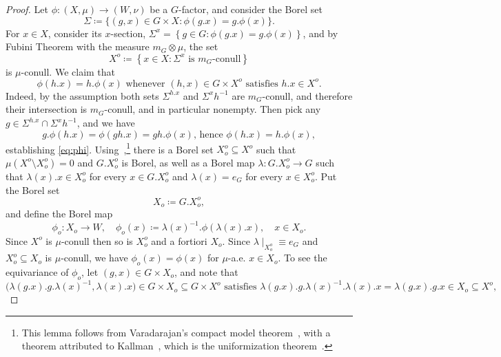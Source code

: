 \documentclass{amsart}
\numberwithin{equation}{subsection}
\theoremstyle{remark}
\begin{document}
\begin{proof}
Let \(\phi:\left(X,\mu\right)\to\left(W,\nu\right)\) be a \(G\)-factor, and consider the Borel set
\[\Sigma\coloneqq \{\left(g,x\right)\in G\times X:\phi\left(g.x\right)=g.\phi \left(x\right)\}.\]
For \(x\in X\), consider its \(x\)-section, \(\Sigma^{x}=\left\{g\in G: \phi\left(g.x\right)=g.\phi\left(x\right)\right\} \), and by Fubini Theorem with the measure \(m_{G}\otimes\mu\), the set
\[X^{o}\coloneqq \left\{x\in X:\Sigma^{x}\text{ is }m_{G}\text{-conull}\right\}\]
is \(\mu\)-conull. We claim that
\begin{equation}\label{eq:phi}
\phi\left(h.x\right)=h.\phi\left(x\right)\text{ whenever }\left(h,x\right)\in G\times X^{o}\text{ satisfies }h.x\in X^{o}.
\end{equation}
Indeed, by the assumption both sets \(\Sigma^{h.x}\) and \(\Sigma^{x}h^{-1}\) are \(m_{G}\)-conull, and therefore their intersection is \(m_{G}\)-conull, and in particular nonempty. Then pick any \(g\in \Sigma^{h.x}\cap \Sigma^{x}h^{-1}\), and we have
\[g.\phi\left(h.x\right)=\phi\left(gh.x\right)=gh.\phi\left(x\right)\text{, hence }\phi\left(h.x\right)=h.\phi\left(x\right),\]
establishing \eqref{eq:phi}. Using~\cite[Lemma B.8]{Zimmer1984},\footnote{This lemma follows from Varadarajan's compact model theorem~\cite[Ch.~V, \S3, Theorem~5.7]{Varadarajan1968}, with a theorem attributed to Kallman~\cite[Theorem A.5]{Zimmer1984}, which is the uniformization theorem~\cite[Theorem (18.18)]{kechris2012classical}.} there is a Borel set \(X_{o}^{o}\subseteq X^{o}\) such that \(\mu\left(X^{o}\setminus X_{o}^{o}\right)=0\) and \(G.X_{o}^{o}\) is Borel, as well as a Borel map \(\lambda:G.X_{o}^{o}\to G\) such that \(\lambda\left(x\right).x\in X_{o}^{o}\) for every \(x\in G.X_{o}^{o}\) and \(\lambda\left(x\right)=e_{G}\) for every \(x\in X_{o}^{o}\). Put the Borel set
\[X_{o}\coloneqq G.X_{o}^{o},\]
and define the Borel map
\[\phi_{o}:X_{o}\longrightarrow W,\quad \phi_{o}\left(x\right)\coloneqq \lambda\left(x\right)^{-1}.\phi\left(\lambda\left(x\right).x\right),\quad x\in X_{o}.\]
Since \(X^{o}\) is \(\mu\)-conull then so is \(X_{o}^{o}\) and a fortiori \(X_{o}\). Since \(\lambda\mid_{X_{o}^{o}}\equiv e_{G}\) and \(X_{o}^{o}\subseteq X_{o}\) is \(\mu\)-conull, we have \(\phi_{o}\left(x\right)=\phi\left(x\right)\) for \(\mu\)-a.e. \(x\in X_{o}\). To see the equivariance of \(\phi_{o}\), let \(\left(g,x\right)\in G\times X_{o}\), and note that
\[\big(\lambda\left(g.x\right).g.\lambda\left(x\right)^{-1},\lambda\left(x\right).x\big)\in G\times X_{o}\subseteq G\times X^{o}\text{ satisfies }\lambda\left(g.x\right).g.\lambda\left(x\right)^{-1}.\lambda\left(x\right).x=\lambda\left(g.x\right).g.x\in X_{o}\subseteq X^{o},\]

\end{proof}
\end{document}
